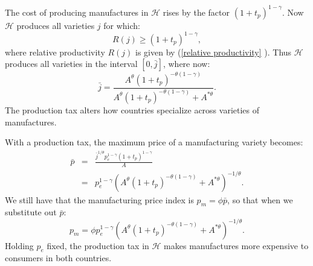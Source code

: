 \documentclass[notitlepage,12pt]{article}
\begin{document}
The cost of producing manufactures in $\mathcal{H}$ rises by the factor $%
(1+t_{p})^{1-\gamma }$. Now $\mathcal{H}$ produces all varieties $j$ for
which:%
\begin{equation*}
R(j)\geq \left( 1+t_{p}\right) ^{1-\gamma },
\end{equation*}%
where relative productivity $R(j)$ is given by (\ref{relative productivity}%
). Thus $\mathcal{H}$ produces all varieties in the interval $[0,\bar{j}]$,
where now:%
\begin{equation}
\bar{j}=\frac{A^{\theta }\left( 1+t_{p}\right) ^{-\theta \left( 1-\gamma
\right) }}{A^{\theta }\left( 1+t_{p}\right) ^{-\theta \left( 1-\gamma
\right) }+A^{\ast \theta }}.  \label{jbar home production tax}
\end{equation}%
The production tax alters how countries specialize across varieties of
manufactures.

With a production tax, the maximum price of a manufacturing variety becomes:%
\begin{eqnarray*}
\bar{p} &=&\frac{\bar{j}^{1/\theta }p_{e}^{1-\gamma }\left( 1+t_{p}\right)
^{1-\gamma }}{A} \\
&=&p_{e}^{1-\gamma }\left( A^{\theta }\left( 1+t_{p}\right) ^{-\theta \left(
1-\gamma \right) }+A^{\ast \theta }\right) ^{-1/\theta }.
\end{eqnarray*}%
We still have that the manufacturing price index is $p_{m}=\phi \bar{p}$, so
that when we substitute out $\bar{p}$: 
\begin{equation*}
p_{m}=\phi p_{e}^{1-\gamma }\left( A^{\theta }\left( 1+t_{p}\right)
^{-\theta \left( 1-\gamma \right) }+A^{\ast \theta }\right) ^{-1/\theta }.
\end{equation*}%
Holding $p_{e}$ fixed, the production tax in $\mathcal{H}$ makes
manufactures more expensive to consumers in both countries.
\end{document}
